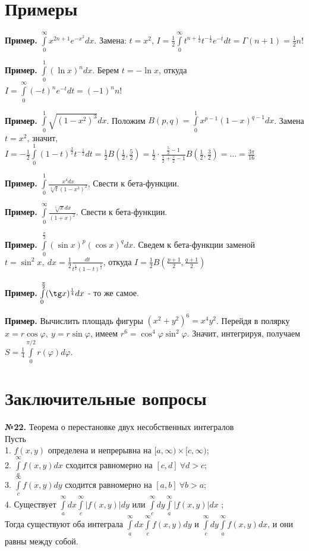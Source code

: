 \section{Примеры}
\textbf{Пример.} $\int\limits_{0}^{\infty} x^{2n+1}e^{-x^2}dx$. Замена:
$t=x^2$,  $I=\frac{1}{2}\int\limits_{0}^{\infty} t^{n+\frac{1}{2}}
t^{-\frac{1}{2}}e^{-t}dt=\Gamma(n+1)=\frac{1}{2}n!$ 

\textbf{Пример.} $\int\limits_{0}^{1} (\ln x)^ndx$. Берем $t=-\ln x$, откуда
$I=\int\limits_{0}^{\infty}(-t)^ne^{-t}dt=(-1)^nn!$

\textbf{Пример.} $\int\limits_{0}^{1}\sqrt{(1-x^2)^3}dx$. Положим
$B(p,q)=\int\limits_{0}^{1}x^{p-1}(1-x)^{q-1}dx$. Замена $t=x^2$, значит,
$I=-\frac{1}{2}\int\limits_{0}^{1}(1-t)^{\frac{3}{2}}t^{-\frac{1}{2}}dt=
\frac{1}{2}B(\frac{1}{2},\frac{5}{2})=\frac{1}{2}\cdot \frac{\frac{5}{2}-1}
{\frac{1}{2}+\frac{5}{2}-1}B(\frac{1}{2},\frac{3}{2})=...=
\frac{3\pi}{16}$ 

\textbf{Пример.} $\int\limits_{0}^{1} \frac{x^4dx}{\sqrt[3]t{(1-x^3)^2}}$,
Свести к бета-функции.

\textbf{Пример.} $\int\limits_{0}^{\infty}\frac{\sqrt[5]{x}dx}{(1+x)^2}$. 
Свести к бета-функции.

\textbf{Пример.} $\int\limits_{0}^{\frac{\pi}{2}}(\sin x)^p(\cos x)^qdx$.
Сведем к бета-функции заменой $t=\sin^2x,~dx=\frac{1}{2}\frac{dt}{
t^\frac{1}{2}(1-t)^\frac{1}{2}}$, откуда
$I=\frac{1}{2}B(\frac{p+1}{2},\frac{q+1}{2})$ 

\textbf{Пример.} $\int\limits_{0}^{\frac{\pi}{2}}(\tg x)^{\frac{1}{4}}dx$ - 
то же самое.

\textbf{Пример.} Вычислить площадь фигуры
$(x^2+y^2)^6=x^4y^2$. Перейдя в полярку  $x=r\cos\varphi,~y=r\sin\varphi$,
имеем $r^6=\cos^4\varphi\sin^2\varphi$.  Значит, интегрируя, 
получаем $S=\frac{1}{4}\int\limits_{0}^{\pi/2}r(\varphi)d\varphi$. 

\section{Заключительные вопросы}
\textbf{№22.} Теорема о перестановке двух несобственных интегралов\\
    Пусть\\
    1. $f(x,y)$ определена и непрерывна на $[a,\infty)\times [c,\infty)$;\\
    2. $\int\limits_{a}^{\infty}f(x,y)dx$ сходится равномерно на 
    $[c,d]~\forall d>c$;\\
    3. $\int\limits_{c}^{\infty}f(x,y)dy$ сходится равномерно на 
    $[a,b]~\forall b>a$;\\
    4. Существует $\int\limits_{a}^{\infty}dx \int\limits_{c}^{\infty}
    |f(x,y)|dy$ или  $\int\limits_{c}^{\infty}dy \int\limits_{a}^{\infty}
    |f(x,y)|dx$ ;\\
    Тогда существуют  оба интеграла 
    $\int\limits_{a}^{\infty}dx \int\limits_{c}^{\infty}f(x,y)dy$
    и  $\int\limits_{c}^{\infty}dy \int\limits_{a}^{\infty}f(x,y)dx$,
    и они равны между собой. 

